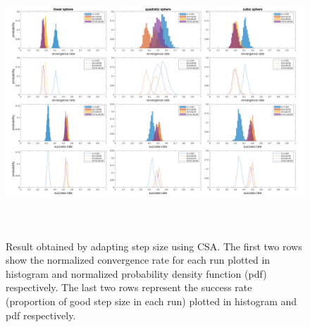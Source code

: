 \begin{center}
\begin{figure}
\includegraphics[height=4in, width=6in]{success_convergence_v4}
\caption{Result obtained by adapting step size using CSA. The first two rows show the normalized convergence rate for each run plotted in histogram and normalized probability density function (pdf) respectively. The last two rows represent the success rate (proportion of good step size in each run) plotted in histogram and pdf respectively.}
\label{fig:success_convergence_plot}
\end{figure}
\end{center}

